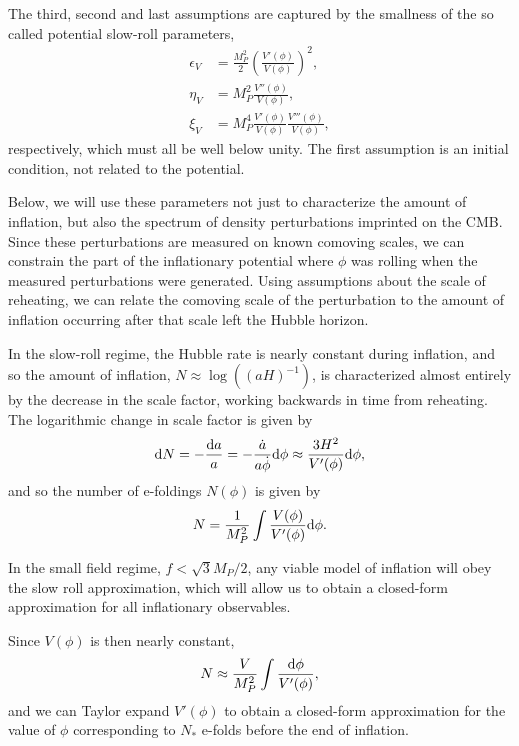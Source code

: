 \documentclass[aps,amsfonts,amsmath,prd,preprint,nofootinbib,superscriptaddress]{revtex4}
\newcommand{\Mp}{{M_{P}}}
\newcommand{\MMp}{{M_P^2}}
\newcommand{\rmd}{{\rm d}}
\begin{document}
The third, second and last assumptions are captured by the smallness of the so called potential slow-roll parameters,
\begin{align}
\epsilon_V &= \frac{\MMp}{2}\left(\frac{V'(\phi)}{V(\phi)}\right)^2,\\
\eta_V &=  \MMp \frac{V''(\phi)}{V(\phi)},\\
\xi_V &= M^4_{P} \frac{V'(\phi)}{V(\phi)}\frac{V'''(\phi)}{V(\phi)},
\end{align}
respectively, which must all be well below unity.  The first assumption is an initial condition, not related to the potential.

Below, we will use these parameters not just to characterize the amount of inflation, but also the spectrum
of density perturbations imprinted on the CMB.  Since these perturbations are measured on known comoving scales, we
can constrain the part of the inflationary potential where $\phi$ was rolling when the measured perturbations were generated.  Using assumptions about the
scale of reheating, we can relate the comoving scale of the perturbation to the amount of inflation occurring after that scale left the Hubble horizon.  

In the slow-roll regime, the Hubble rate is nearly constant during inflation, and so the amount of inflation, $N \approx \log\left((a H)^{-1}\right)$, is characterized 
almost entirely  by the decrease in the scale factor, working backwards in time from reheating.
The logarithmic change in scale factor is given by
\begin{align}
\rmd N = -\frac{\rmd a}{a} = -\frac{\dot a}{a\dot\phi}\rmd\phi \approx \frac{3H^2}{V'(\phi)}\rmd\phi,
\end{align}
and so the number of e-foldings $N(\phi)$ is given by
\begin{align}
N = \frac{1}{\MMp}\int \frac{V(\phi)}{V'(\phi)}\rmd\phi.
\end{align}





In the small field regime, $f <\sqrt{3}\Mp/2$, any viable model of inflation will obey the slow roll approximation,
which will allow us to obtain a closed-form approximation for all inflationary observables.  


Since $V(\phi)$ is then nearly constant, 
\begin{align}
N \approx \frac{V}{\MMp}\int\frac{\rmd\phi}{V'(\phi)},
\end{align}
and we can Taylor expand $V'(\phi)$ to obtain a closed-form approximation for the value of $\phi$ corresponding to $N_\ast$ e-folds before the end of inflation.
\end{document}
